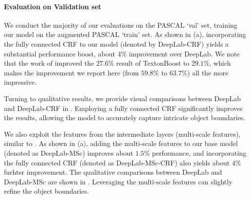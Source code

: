 \paragraph{Evaluation on Validation set} We conduct the majority of our evaluations on the PASCAL `val' set, training our model on the augmented PASCAL `train' set. As shown in  (a), incorporating the fully connected CRF to our model (denoted by DeepLab-CRF) yields a substantial performance boost, about 4\% improvement over DeepLab. We note that the work of \citet{krahenbuhl2011efficient} improved the $27.6\%$
result of TextonBoost \citep{shotton2009textonboost} to $29.1\%$, which makes the  improvement we report here (from $59.8\%$ to $63.7\%$) all the more impressive.

Turning to qualitative results, we provide visual comparisons between DeepLab and DeepLab-CRF in . Employing a fully connected CRF significantly improves the results, allowing the model to accurately capture intricate object boundaries. 

We also exploit the features from the intermediate layers (\ie multi-scale features), similar to \citet{hariharan2014hypercolumns, long2014fully}. As shown in  (a), adding the multi-scale features to our base model (denoted as DeepLab-MSc) improves about $1.5\%$ performance, and incorporating the fully connected CRF (denoted as DeepLab-MSc-CRF) also yields about 4\% furhter improvement. The qualitative comparisons between DeepLab and DeepLab-MSc are shown in . Leveraging the multi-scale features can slightly refine the object boundaries.

